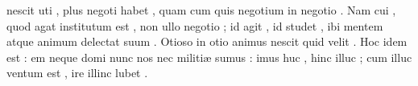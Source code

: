 \documentclass[12pt,onecolumn,twoside,a4paper]{memoir}
\begin{document}
\begin{pairs}
\begin{Leftside}
                              nescit
                              uti
                              ,
                              plus
                              negoti
                              habet
                              ,
                              quam
                              cum
                              quis
                              negotium
                              in
                              negotio
                              .
                              Nam
                              cui
                              ,
                              quod
                              agat
                              institutum
                              est
                              ,
                              non
                              ullo
                              negotio
                              ;
                              id
                              agit
                              ,
                              id
                              studet
                              ,
                              ibi
                              mentem
                              atque
                              animum
                              delectat
                              suum
                              .
                              Otioso
                              in
                              otio
                              animus
                              nescit
                              quid
                              velit
                              .
                              Hoc
                              idem
                              est
                              :
                              em
                              neque
                              domi
                              nunc
                              nos
                              nec
                              militiæ
                              sumus
                              :
                              imus
                              huc
                              ,
                              hinc
                              illuc
                              ;
                              cum
                              illuc
                              ventum
                              est
                              ,
                              ire
                              illinc
                              lubet
                              .

\end{Leftside}
\end{pairs}
\end{document}
